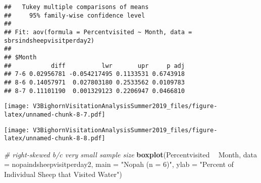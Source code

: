 \documentclass[]{article}
\newenvironment{Shaded}{\begin{snugshade}}{\end{snugshade}}
\newcommand{\CommentTok}[1]{\textcolor[rgb]{0.56,0.35,0.01}{\textit{#1}}}
\newcommand{\DataTypeTok}[1]{\textcolor[rgb]{0.13,0.29,0.53}{#1}}
\newcommand{\KeywordTok}[1]{\textcolor[rgb]{0.13,0.29,0.53}{\textbf{#1}}}
\newcommand{\NormalTok}[1]{#1}
\newcommand{\OperatorTok}[1]{\textcolor[rgb]{0.81,0.36,0.00}{\textbf{#1}}}
\newcommand{\StringTok}[1]{\textcolor[rgb]{0.31,0.60,0.02}{#1}}
\begin{document}
\begin{verbatim}
##   Tukey multiple comparisons of means
##     95% family-wise confidence level
## 
## Fit: aov(formula = Percentvisited ~ Month, data = sbrsindsheepvisitperday2)
## 
## $Month
##           diff          lwr       upr     p adj
## 7-6 0.02956781 -0.054217495 0.1133531 0.6743918
## 8-6 0.14057971  0.027803180 0.2533562 0.0109783
## 8-7 0.11101190  0.001329123 0.2206947 0.0466810
\end{verbatim}

\begin{Shaded}
\end{Shaded}

\texttt{[image: V3BighornVisitationAnalysisSummer2019\_files/figure-latex/unnamed-chunk-8-7.pdf]}

\begin{Shaded}
\end{Shaded}

\texttt{[image: V3BighornVisitationAnalysisSummer2019\_files/figure-latex/unnamed-chunk-8-8.pdf]}

\begin{Shaded}
\begin{Highlighting}[]
\CommentTok{# right-skewed b/c very small sample size}
\KeywordTok{boxplot}\NormalTok{(Percentvisited }\OperatorTok{~}\StringTok{ }\NormalTok{Month, }\DataTypeTok{data =}\NormalTok{ nopaindsheepvisitperday2, }\DataTypeTok{main =} \StringTok{"Nopah (n = 6)"}\NormalTok{, }\DataTypeTok{ylab =} \StringTok{"Percent of Individual Sheep that Visited Water"}\NormalTok{)}
\end{Highlighting}
\end{Shaded}
\end{document}
